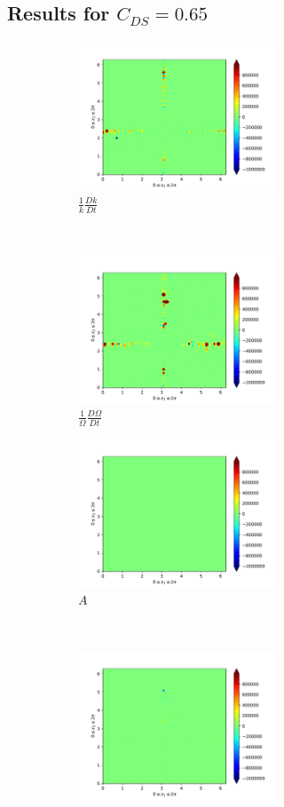 \subsection{Results for $C_{DS}=0.65$}
\begin{figure}[H]
    \begin{subfigure}[H]{0.45\textwidth}
        \includegraphics[height=1.75in]{media/run-cds-65/ke-RHS-CDS-65}
        \caption{$\frac{1}{k} \frac{Dk}{Dt}$}
    \end{subfigure}
    ~
    \begin{subfigure}[H]{0.45\textwidth}
        \includegraphics[height=1.75in]{media/run-cds-65/enstrophy-RHS-CDS-65}
        \caption{$\frac{1}{\Omega} \frac{D \Omega}{Dt}$}
    \end{subfigure}
    \newline
    \begin{subfigure}{0.45\textwidth}
        \includegraphics[height=1.75in]{media/run-cds-65/A-enst-CDS-65}
        \caption{$A$}
    \end{subfigure}
    ~
    \begin{subfigure}{0.45\textwidth}
        \includegraphics[height=1.75in]{media/run-cds-65/trans-enst-CDS-65}

\end{subfigure}
\end{figure}
